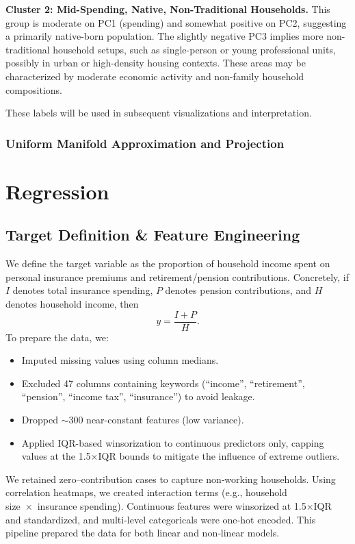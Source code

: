 \documentclass{article}
\begin{document}
\textbf{Cluster 2: Mid-Spending, Native, Non-Traditional Households.}  
This group is moderate on PC1 (spending) and somewhat positive on PC2, suggesting a primarily native-born population. The slightly negative PC3 implies more non-traditional household setups, such as single-person or young professional units, possibly in urban or high-density housing contexts. These areas may be characterized by moderate economic activity and non-family household compositions.

These labels will be used in subsequent visualizations and interpretation.

\subsubsection{Uniform Manifold Approximation and Projection}

\section{Regression}

\subsection*{Target Definition \& Feature Engineering}
We define the target variable as the proportion of household income spent on personal insurance premiums and retirement/pension contributions. Concretely, if $I$ denotes total insurance spending, $P$ denotes pension contributions, and $H$ denotes household income, then
\[
  y = \frac{I + P}{H}.
\]
To prepare the data, we:
\begin{itemize}
  \item Imputed missing values using column medians.
  \item Excluded 47 columns containing keywords (``income'', ``retirement'', ``pension'', ``income tax'', ``insurance'') to avoid leakage.
  \item Dropped $\sim$300 near-constant features (low variance).
  \item Applied IQR-based winsorization to continuous predictors only, capping values at the 1.5\(\times\)IQR bounds to mitigate the influence of extreme outliers.
\end{itemize}

We retained zero–contribution cases to capture non‑working households. Using correlation heatmaps, we created interaction terms (e.g., household size × insurance spending). Continuous features were winsorized at 1.5×IQR and standardized, and multi-level categoricals were one‑hot encoded. This pipeline prepared the data for both linear and non‑linear models.
\end{document}
